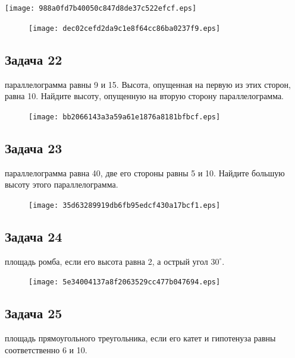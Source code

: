 \documentclass[a4paper,10pt]{article} %
\begin{document}
\begin{spacing}{1.0}
{\texttt{[image: 988a0fd7b40050c847d8de37c522efcf.eps]}

\vspace{1.5cm}

\begin{figure}{\texttt{[image: dec02cefd2da9c1e8f64cc86ba0237f9.eps]}}\end{figure}
\subsection*{Задача 22}
 параллелограмма равны 9 и 15. Высота, опущенная на первую из этих сторон, равна 10. Найдите высоту, опущенную на вторую сторону параллелограмма. 

\vspace{1.5cm}

\begin{figure}{\texttt{[image: bb2066143a3a59a61e1876a8181bfbcf.eps]}}\end{figure}
\subsection*{Задача 23}
 параллелограмма равна 40, две его стороны равны 5 и 10. Найдите большую высоту этого параллелограмма.

\vspace{1.5cm}

\begin{figure}{\texttt{[image: 35d63289919db6fb95edcf430a17bcf1.eps]}}\end{figure}
\subsection*{Задача 24}
 площадь ромба, если его высота равна 2, а острый угол $30^\circ$. 

\vspace{1.5cm}

\begin{figure}{\texttt{[image: 5e34004137a8f2063529cc477b047694.eps]}}\end{figure}
\subsection*{Задача 25}
 площадь прямоугольного треугольника, если его катет и гипотенуза равны соответственно 6 и 10.

\vspace{1.5cm}

}
\end{spacing}
\end{document}
